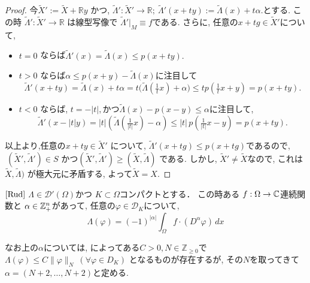 \begin{proof}
今\(\widetilde{X}' := \widetilde{X} + \mathbb{R}y\) かつ, 
\(\widetilde{\Lambda}' : \widetilde{X}' \to \mathbb{R} ; \ \widetilde{\Lambda}'(x+ty) := \widetilde{\Lambda}(x) + t\alpha.\)とする. 
この時  \(\widetilde{\Lambda}' : \widetilde{X}' \to \mathbb{R}\) は線型写像で \(\widetilde{\Lambda}'|_M \equiv f\)である. 
さらに, 任意の\(x+tg \in \widetilde{X}'\)について, 
\begin{itemize}
\item \(t=0\) ならば\(\widetilde{\Lambda}'(x) = \widetilde{\Lambda}(x) \leq p(x+ty).\)
\item \(t>0\) ならば$\alpha \leq p(x+y)-\widetilde{\Lambda}(x)$に注目して
\[\widetilde{\Lambda}'(x+ty) = \widetilde{\Lambda}(x) + t\alpha = t\bigl(\widetilde{\Lambda}(\tfrac{1}{t}x) + \alpha \bigr) \leq t p(\tfrac{1}{t}x+y) = p(x+ty).
\]
\item \(t<0\) ならば,  \(t=-|t|,\)かつ\(\widetilde{\Lambda}(x)-p(x-y)\leq \alpha\)に注目して, 
\[
 \widetilde{\Lambda}'(x-|t|y) = |t|(\widetilde{\Lambda}(\tfrac{1}{|t|}x) - \alpha) \leq |t| \, p(\tfrac{1}{|t|}x-y) = p(x+ty).
\]
\end{itemize}
以上より,任意の$x+ty\in \widetilde{X}'$ について, 
\( \widetilde{\Lambda}'(x+tg) \leq p(x+tg) \)であるので, 
\(\ (\widetilde{X}',\widetilde{\Lambda}') \in S \) かつ\((\widetilde{X}',\widetilde{\Lambda}') \geq (\widetilde{X},\widetilde{\Lambda}) \)
である. 
しかし, \(\widetilde{X}' \neq \widetilde{X}\)なので, これは
\(\widetilde{X},\widetilde{\Lambda})\) が極大元に矛盾する, 
よって\( \widetilde{X}=X.\)
\end{proof}


\begin{tcolorbox}[mybox]
\begin{thm}{$\cite[Thm 6.26]{Rud}$}
\label{thm-H-2.4}
\(\Lambda \in \mathcal{D}'(\Omega)\)かつ \(K \subset \Omega\)コンパクトとする．
この時ある \(f : \Omega \to \mathbb{C}\)連続関数と \(\alpha \in \mathbb{Z}_+^n\)があって, 
任意の\(\varphi \in \mathcal{D}_K\)について, 
\[
 \Lambda(\varphi) = (-1)^{|\alpha|} \int_{\Omega} f\cdot (D^{\alpha}\varphi)\, dx
\]
\end{thm}
\end{tcolorbox}
なお上の$\alpha$については, 
\cite[Thm6.8]{Rud}によってある\( C>0,  N \in \mathbb{Z}_{\geq 0}\)で
\(\Lambda(\varphi) \leq C \|\varphi\|_N \ (\forall \varphi \in D_K)\) 
となるものが存在するが, その$N$を取ってきて
\(\alpha = (N+2,\ldots,N+2)\)と定める.

